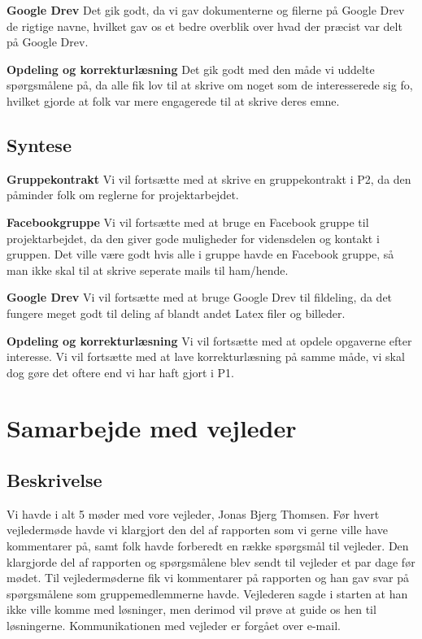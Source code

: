 \textbf{Google Drev}
Det gik godt, da vi gav dokumenterne og filerne på Google Drev de rigtige navne, hvilket gav os et bedre overblik over hvad der præcist var delt på Google Drev.


\textbf{Opdeling og korrekturlæsning}
Det gik godt med den måde vi uddelte spørgsmålene på, da alle fik lov til at skrive om noget som de interesserede sig fo, hvilket gjorde at folk var mere engagerede til at skrive deres emne.


\subsection{Syntese}
\textbf{Gruppekontrakt}
Vi vil fortsætte med at skrive en gruppekontrakt i P2, da den påminder folk om reglerne for projektarbejdet. 

\textbf{Facebookgruppe}
Vi vil fortsætte med at bruge en Facebook gruppe til projektarbejdet, da den giver gode muligheder for vidensdelen og kontakt i gruppen. Det ville være godt hvis alle i gruppe havde en Facebook gruppe, så man ikke skal til at skrive seperate mails til ham/hende.

\textbf{Google Drev}
Vi vil fortsætte med at bruge Google Drev til fildeling, da det fungere meget godt til deling af blandt andet Latex filer og billeder.


\textbf{Opdeling og korrekturlæsning}
Vi vil fortsætte med at opdele opgaverne efter interesse.
Vi vil fortsætte med at lave korrekturlæsning på samme måde, vi skal dog gøre det oftere end vi har haft gjort i P1.


\section{Samarbejde med vejleder}
\subsection{Beskrivelse}
Vi havde i alt 5 møder med vore vejleder, Jonas Bjerg Thomsen. Før hvert vejledermøde havde vi klargjort den del af rapporten som vi gerne ville have kommentarer på, samt folk havde forberedt en række spørgsmål til vejleder. Den klargjorde del af rapporten og spørgsmålene blev sendt til vejleder et par dage før mødet. Til vejledermøderne fik vi kommentarer på rapporten og han gav svar på spørgsmålene som gruppemedlemmerne havde. Vejlederen sagde i starten at han ikke ville komme med løsninger, men derimod vil prøve at guide os hen til løsningerne. Kommunikationen med vejleder er forgået over e-mail.

